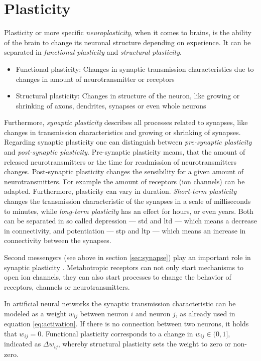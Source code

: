 \section{Plasticity}
\label{sec:plasticity}

Plasticity or more specific \emph{neuroplasticity}, when it comes to brains, is the ability of the brain to change its neuronal structure depending on experience. It can be separated in \emph{functional plasticity} and \emph{structural plasticity}.

\begin{itemize}
\item Functional plasticity: Changes in synaptic transmission characteristics due to changes in amount of neurotransmitter or receptors
\item Structural plasticity: Changes in structure of the neuron, like growing or shrinking of axons, dendrites, synapses or even whole neurons
\end{itemize}

Furthermore, \emph{synaptic plasticity} describes all processes related to synapses, like changes in transmission characteristics and growing or shrinking of synapses. Regarding synaptic plasticity one can distinguish between \emph{pre-synaptic plasticity} and \emph{post-synaptic plasticity}. Pre-synaptic plasticity means, that the amount of released neurotransmitters or the time for readmission of neurotransmitters changes. Post-synaptic plasticity changes the sensibility for a given amount of neurotransmitters. For example the amount of receptors (ion channels) can be adapted. Furthermore, plasticity can vary in duration. \emph{Short-term plasticity} changes the transmission characteristic of the synapses in a scale of milliseconds to minutes, while \emph{long-term plasticity} has an effect for hours, or even years. Both can be separated in so called depression --- \acf{std} and \acf{ltd} --- which means a decrease in connectivity, and potentiation --- \acf{stp} and \acf{ltp} --- which means an increase in connectivity between the synapses.

Second messengers (see above in section \ref{sec:synapse}) play an important role in synaptic plasticity \parencite{skrebitskiui1999synaptic}. Metabotropic receptors can not only start mechanisms to open ion channels, they can also start processes to change the behavior of receptors, channels or neurotransmitters.

In artificial neural networks the synaptic transmission characteristic can be modeled as a weight $w_{ij}$ between neuron $i$ and neuron $j$, as already used in equation \eqref{eq:activation}. If there is no connection between two neurons, it holds that $w_{ij} = 0$. Functional plasticity corresponds to a change in $w_{ij} \in (0,1]$, indicated as $\Delta w_{ij}$, whereby structural plasticity sets the weight to zero or non-zero.

